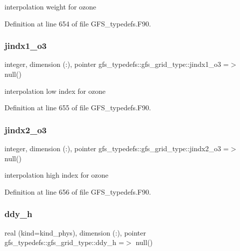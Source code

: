 interpolation weight for ozone 



Definition at line 654 of file G\+F\+S\+\_\+typedefs.\+F90.

\mbox{\label{structgfs__typedefs_1_1gfs__grid__type_ae7152f13d5b0e409cc0c0f4c3456be04}} 
\subsubsection{jindx1\+\_\+o3}
{\footnotesize\ttfamily integer, dimension (\+:), pointer gfs\+\_\+typedefs\+::gfs\+\_\+grid\+\_\+type\+::jindx1\+\_\+o3 =$>$ null()}



interpolation low index for ozone 



Definition at line 655 of file G\+F\+S\+\_\+typedefs.\+F90.

\mbox{\label{structgfs__typedefs_1_1gfs__grid__type_a9d787660cfffab1244b1214c35abf443}} 
\subsubsection{jindx2\+\_\+o3}
{\footnotesize\ttfamily integer, dimension (\+:), pointer gfs\+\_\+typedefs\+::gfs\+\_\+grid\+\_\+type\+::jindx2\+\_\+o3 =$>$ null()}



interpolation high index for ozone 



Definition at line 656 of file G\+F\+S\+\_\+typedefs.\+F90.

\mbox{\label{structgfs__typedefs_1_1gfs__grid__type_a5cb8618b83a52ce40b355fc9cd9104ca}} 
\subsubsection{ddy\+\_\+h}
{\footnotesize\ttfamily real (kind=kind\+\_\+phys), dimension     (\+:), pointer gfs\+\_\+typedefs\+::gfs\+\_\+grid\+\_\+type\+::ddy\+\_\+h =$>$ null()}



